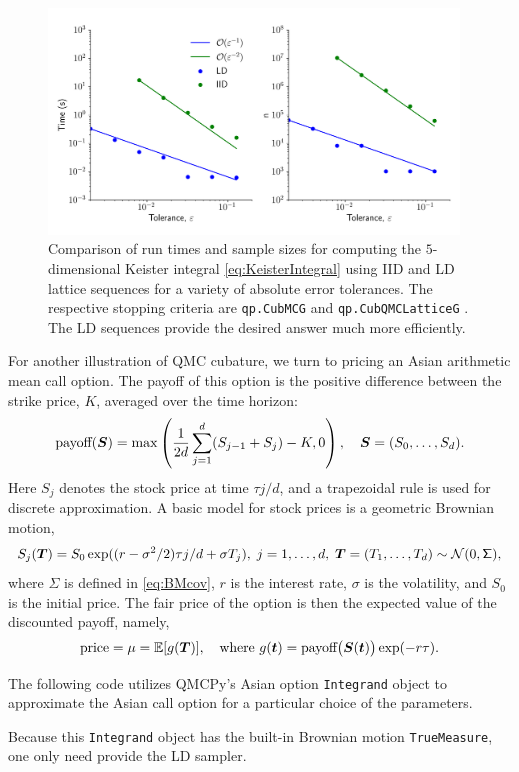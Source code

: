 \documentclass[graybox,footinfo]{svmult}
\newcommand{\mSigma}{\mathsf{\Sigma}}
\begin{document}
\begin{figure}
	\includegraphics[height=6cm]{QMCSoftwareArticle/figs/sc_comp.png}
	\caption{Comparison of run times and sample sizes for computing the $5$-dimensional Keister integral \eqref{eq:KeisterIntegral} using IID and LD lattice sequences for a variety of absolute error tolerances. The respective stopping criteria are  \texttt{qp.CubMCG} \cite{HicEtal14a} and  \texttt{qp.CubQMCLatticeG} \cite{JimHic16a}. The LD sequences provide the desired answer much more efficiently.}
	\label{fig:sc_comp}
\end{figure}

For another illustration of QMC cubature, we turn to pricing an Asian arithmetic mean call option. The payoff of this option is the positive difference between the strike price, $K$, averaged over the time horizon: 
$$
\text{payoff}({\boldsymbol{S}}) = \max\left(\frac{1}{2d}\sum_{j=1}^d (S_{j-1}+S_j)-K,0\right), \quad {\boldsymbol{S}} = (S_0, \ldots, S_d).
$$
Here $S_j$ denotes the stock price at time $\tau j/d$, and a trapezoidal rule is used for discrete approximation.  A basic model for stock prices is a geometric Brownian motion, 
\[
S_j(\bsT) = S_0 \exp((r - \sigma^2/2) \tau j/d + \sigma T_j),   \;  j = 1, \ldots, d, \; \bsT = (T_1, \ldots, T_d)\sim \calN(0,\mSigma),
\]
where $\mSigma$ is defined in \eqref{eq:BMcov}, $r$ is the interest rate, $\sigma$ is the volatility, and $S_0$ is the initial price.  The fair price of the option is then the expected value of the discounted payoff, namely,
\begin{equation*}
	\text{price} = \mu = {\mathbb{E}}[g({\boldsymbol{T}})], \quad \text{where } g({\boldsymbol{t}}) = \text{payoff}\bigl({\boldsymbol{S}}({\boldsymbol{t}}) \bigr) \exp(-r \tau).
\end{equation*}

The following code utilizes QMCPy's Asian option \texttt{Integrand} object to approximate the Asian call option for a particular choice of the parameters.

Because this \texttt{Integrand} object has the built-in Brownian motion \texttt{TrueMeasure}, one only need provide the LD sampler.
\end{document}
